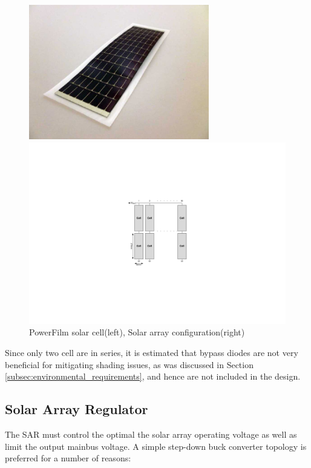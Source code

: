 \begin{figure}[H]
\centering
\begin{minipage}[t]{0.4\linewidth}
\centering
\includegraphics[width=0.7\textwidth]{figures/SolarCell_RC7-2_Powerfilm}
\end{minipage}
\hspace{5mm}
\begin{minipage}[t]{0.55\linewidth}
\centering
\includegraphics[width=\textwidth]{figures/fig_CDR_Solar_Array}
\end{minipage}
\caption{PowerFilm solar cell(left), Solar array configuration(right)}
\label{fig:solar_cell}
\end{figure}

Since only two cell are in series, it is estimated that bypass diodes are not very beneficial for mitigating shading issues, as was discussed in Section \ref{subsec:environmental_requirements}, and hence are not included in the design.

\subsection{Solar Array Regulator}
The \ac{SAR} must control the optimal the solar array operating voltage as well as limit the output mainbus voltage. A simple step-down buck converter topology is preferred for a number of reasons:

